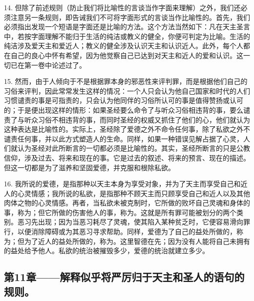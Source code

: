 14. 但除了前述规则（防止我们将比喻性的言谈当作字面来理解）之外，我们还必须注意另一条规则，即告诫我们不可将字面形式的言谈当作比喻性的。首先，我们必须指出发现一个短语是字面还是比喻的方法。这个方法当然如下：凡在天主圣言中，若按字面理解不能归于生活的纯洁或教义的健全，你便可判定为比喻。生活的纯洁涉及爱天主和爱近人；教义的健全涉及认识天主和认识近人。此外，每个人都在自己的良心中怀有希望，因为他觉察自己已达到对天主和近人的爱和认识。这一切已在第一卷中论述过了。\par

15. 然而，由于人倾向于不是根据罪本身的邪恶性来评判罪，而是根据他们自己的习俗来评判，因此常常发生这样的情况：一个人只会认为他自己国家和时代的人们习惯谴责的事是可指责的，只会认为他同伴的习俗所认可的事是值得赞扬或认可的；于是便出现这样的情形：如果圣经要么命令了与听众习俗相违背的事，要么谴责了与听众习俗不相违背的事，而同时圣经的权威又抓住了他们的心，他们就认为这种表达是比喻性的。实际上，圣经除了爱德之外不命令任何事，除了私欲之外不谴责任何事，并以此方式塑造人的生命。同样，如果一种错误见解占据了心灵，人们就认为圣经对此所断言的一切都必须是比喻性的。其实，圣经所断言的只是公教信仰，涉及过去、将来和现在的事。它是过去的叙述、将来的预言、现在的描述。但这一切都是为了滋养和坚固爱德，并克服和根除私欲。\par

16. 我所说的爱德，是指那种以天主本身为享受对象，并为了天主而享受自己和近人的心灵情感；我所说的私欲，是指那种不顾天主而只顾享受自己和近人以及其他肉体之物的心灵情感。再者，当私欲未被克制时，它所做的败坏自己灵魂和身体的事，称为；但它所做的伤害他人的事，称为。这就是所有罪可能被划分的两个类别。恶习先出现；因为当恶习耗尽了灵魂，使其陷入某种贫乏时，它便容易滑向罪行，以便消除障碍或为其恶习寻求帮助。同样，爱德为了自己的益处所做的，称为；但为了近人的益处所做的，称为。这里智德在先；因为没有人能将自己未拥有的益处给予他人。私欲的统治被摧毁多少，爱德的统治就建立多少。\par


\subsection{第11章——解释似乎将严厉归于天主和圣人的语句的规则。}

